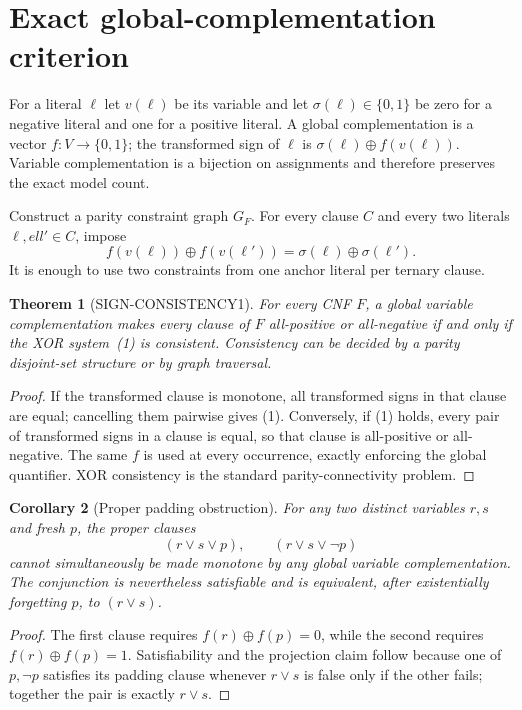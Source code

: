 \documentclass[11pt]{article}
\newtheorem{theorem}{Theorem}
\newtheorem{corollary}[theorem]{Corollary}
\begin{document}
\section{Exact global-complementation criterion}
For a literal $\ell$ let $v(\ell)$ be its variable and let $\sigma(\ell)\in\{0,1\}$ be zero for a negative literal and one for a positive literal.  A global complementation is a vector $f:V\to\{0,1\}$; the transformed sign of $\ell$ is $\sigma(\ell)\oplus f(v(\ell))$.  Variable complementation is a bijection on assignments and therefore preserves the exact model count.

Construct a parity constraint graph $G_F$.  For every clause $C$ and every two literals $\ell,ell'\in C$, impose
\[
 f(v(\ell))\oplus f(v(\ell'))
   =\sigma(\ell)\oplus\sigma(\ell').                 \tag{1}
\]
It is enough to use two constraints from one anchor literal per ternary clause.

\begin{theorem}[SIGN-CONSISTENCY1]
For every CNF $F$, a global variable complementation makes every clause of $F$ all-positive or all-negative if and only if the XOR system~\emph{(1)} is consistent.  Consistency can be decided by a parity disjoint-set structure or by graph traversal.
\end{theorem}
\begin{proof}
If the transformed clause is monotone, all transformed signs in that clause are equal; cancelling them pairwise gives (1).  Conversely, if (1) holds, every pair of transformed signs in a clause is equal, so that clause is all-positive or all-negative.  The same $f$ is used at every occurrence, exactly enforcing the global quantifier.  XOR consistency is the standard parity-connectivity problem.
\end{proof}

\begin{corollary}[Proper padding obstruction]
For any two distinct variables $r,s$ and fresh $p$, the proper clauses
\[
 (r\vee s\vee p),\qquad(r\vee s\vee\neg p)           \tag{2}
\]
cannot simultaneously be made monotone by any global variable complementation.  The conjunction is nevertheless satisfiable and is equivalent, after existentially forgetting $p$, to $(r\vee s)$.
\end{corollary}
\begin{proof}
The first clause requires $f(r)\oplus f(p)=0$, while the second requires $f(r)\oplus f(p)=1$.  Satisfiability and the projection claim follow because one of $p,\neg p$ satisfies its padding clause whenever $r\vee s$ is false only if the other fails; together the pair is exactly $r\vee s$.
\end{proof}
\end{document}
